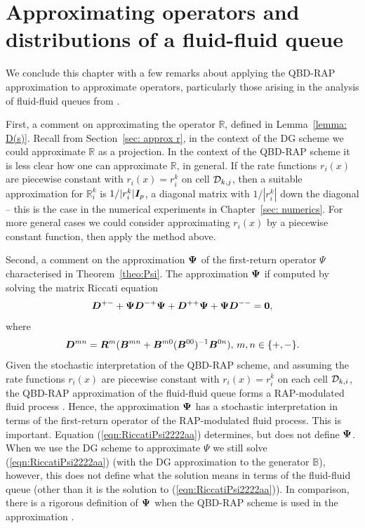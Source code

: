 \section{Approximating operators and distributions of a fluid-fluid queue}
We conclude this chapter with a few remarks about applying the QBD-RAP approximation to approximate operators, particularly those arising in the analysis of fluid-fluid queues from \cite{bo2014}. 

First, a comment on approximating the operator \(\mathbb R\), defined in Lemma~\ref{lemma: D(s)}. Recall from Section~\ref{sec: approx r}, in the context of the DG scheme we could approximate \(\mathbb R\) as a projection. In the context of the QBD-RAP scheme it is less clear how one can approximate \(\mathbb R\), in general. If the rate functions \(r_i(x)\) are piecewise constant with \(r_i(x)=r_i^k\) on cell \(\mathcal{D}_{k,j}\), then a suitable approximation for \(\mathbb R^k_i\) is \(1/|r_i^k|\boldsymbol I_{p}\), a diagonal matrix with \(1/|r_i^k|\) down the diagonal -- this is the case in the numerical experiments in Chapter~\ref{sec: numerics}. For more general cases we could consider approximating \(r_i(x)\) by a piecewise constant function, then apply the method above.

Second, a comment on the approximation \(\boldsymbol \Psi\) of the first-return operator \(\mathbb \Psi\) characterised in Theorem~\ref{theo:Psi}. The approximation \(\boldsymbol \Psi\) if computed by solving the matrix Riccati equation 
\begin{align}\label{eqn:RiccatiPsi2222aa}
    \boldsymbol D^{+-}
+ \boldsymbol \Psi   \boldsymbol D^{-+}\boldsymbol \Psi
+   \boldsymbol D^{++}\boldsymbol \Psi
+ \boldsymbol \Psi  \boldsymbol D^{--}
= \boldsymbol 0,
\end{align}
where 
\[\boldsymbol D^{mn} = \boldsymbol{R}^m (\boldsymbol{B}^{mn} + \boldsymbol{B}^{m0}(\boldsymbol B^{00})^{-1}\boldsymbol{B}^{0n}), \, m,n\in\{+,-\}.\]
Given the stochastic interpretation of the QBD-RAP scheme, and assuming the rate functions \(r_i(x)\) are piecewise constant with \(r_i(x)=r_i^k\) on each cell \(\mathcal{D}_{k,i}\), the QBD-RAP approximation of the fluid-fluid queue forms a RAP-modulated fluid process \citep{p2019,bgnp2021}. Hence, the approximation \(\boldsymbol \Psi\) has a stochastic interpretation in terms of the first-return operator of the RAP-modulated fluid process. This is important. Equation (\ref{eqn:RiccatiPsi2222aa}) determines, but does not define \(\boldsymbol \Psi\). When we use the DG scheme to approximate \(\mathbb \Psi\) we still solve (\ref{eqn:RiccatiPsi2222aa}) (with the DG approximation to the generator \(\mathbb B\)), however, this does not define what the solution means in terms of the fluid-fluid queue (other than it is the solution to (\ref{eqn:RiccatiPsi2222aa})). In comparison, there is a rigorous definition of \(\boldsymbol \Psi\) when the QBD-RAP scheme is used in the approximation \citep{p2019,bgnp2021}. 

